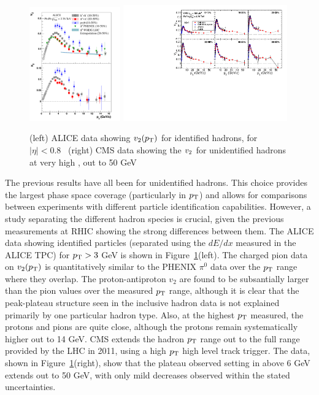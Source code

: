 \begin{figure}[!tb]
\begin{center}
\includegraphics[width=0.35\textwidth]{flowcorrelations_figs/alice_fig5_vn_pid.pdf}
\includegraphics[width=0.63\textwidth]{flowcorrelations_figs/v2_pt_ep_atlas_alice_eta0-1_band_v5.pdf}
\caption[]{(left) ALICE data showing $\mbox{$v_2$}(\mbox{$p_{\mathrm{T}}$})$ for identified
  hadrons, for $|\eta|<0.8$~\cite{Abelev:2012di} (right) CMS data
  showing the $\mbox{$v_2$}$ for unidentified hadrons at very high \pT, out
  to 50 GeV~\cite{Chatrchyan:2012xq}}
\label{fig:pas:fc:highpt}
\end{center}
\end{figure}
The previous results have all been for unidentified hadrons.  This choice provides the largest phase
space coverage (particularly in $\mbox{$p_{\mathrm{T}}$}$) and allows for comparisons between experiments with different particle
identification capabilities.  However, a study separating the different hadron species is crucial, 
given the previous measurements at RHIC showing the strong differences between them.
The ALICE data showing identified particles (separated using the $dE/dx$ measured in the ALICE TPC) for $\mbox{$p_{\mathrm{T}}$}>3$ GeV
is shown in Figure~\ref{fig:pas:fc:highpt}(left).  The charged pion data on $v_2(\mbox{$p_{\mathrm{T}}$})$ is quantitatively similar to
the PHENIX $\pi^0$ data over the $\mbox{$p_{\mathrm{T}}$}$ range where they overlap.  The proton-antiproton $v_2$ are found to be
subsantially larger than the pion values over the measured $\mbox{$p_{\mathrm{T}}$}$ range, although it is clear that the peak-plateau
structure seen in the inclusive hadron data is not explained primarily by one particular hadron type.
Also, at the highest $\mbox{$p_{\mathrm{T}}$}$ measured, the protons and pions are quite close, although the protons remain
systematically higher out to 14 GeV.
CMS extends the hadron $\mbox{$p_{\mathrm{T}}$}$ range out to the full range provided by the LHC in 2011, using a high $\mbox{$p_{\mathrm{T}}$}$
high level track trigger.  The data, shown in Figure~\ref{fig:pas:fc:highpt}(right), show that the 
plateau observed setting in above 6 GeV extends out to 50 GeV, with only mild decreases observed within
the stated uncertainties.

